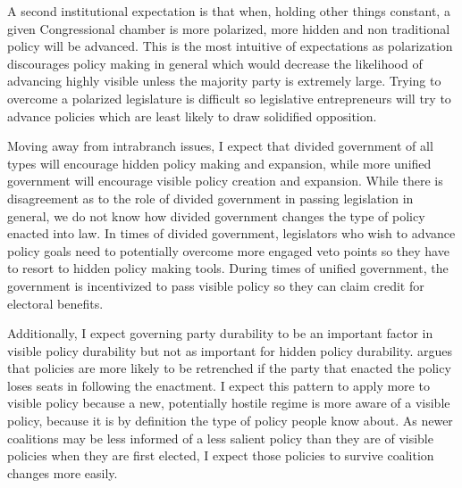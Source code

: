 \documentclass[12pt]{article}
\begin{document}
A second institutional expectation is that when, holding other things constant, a given Congressional chamber is more polarized, more hidden and non traditional policy will be advanced. This is the most intuitive of expectations as polarization discourages policy making in general which would decrease the likelihood of advancing highly visible unless the majority party is extremely large. Trying to overcome a polarized legislature is difficult so legislative entrepreneurs will try to advance policies which are least likely to draw solidified opposition.

Moving away from intrabranch issues, I expect that divided government of all types will encourage hidden policy making and expansion, while more unified government will encourage visible policy creation and expansion. While there is disagreement as to the role of divided government in passing legislation in general, we do not know how divided government changes the type of policy enacted into law. In times of divided government, legislators who wish to advance policy goals need to potentially overcome more engaged veto points so they have to resort to hidden policy making tools. During times of unified government, the government is incentivized to pass visible policy so they can claim credit for electoral benefits.

Additionally, I expect governing party durability to be an important factor in visible policy durability but not as important for hidden policy durability. \citet{berry2012} argues that policies are more likely to be retrenched if the party that enacted the policy loses seats in following the enactment. I expect this pattern to apply more to visible policy because a new, potentially hostile regime is more aware of a visible policy, because it is by definition the type of policy people know about. As newer coalitions may be less informed of a less salient policy than they are of visible policies when they are first elected, I expect those policies to survive coalition changes more easily. 
\end{document}
